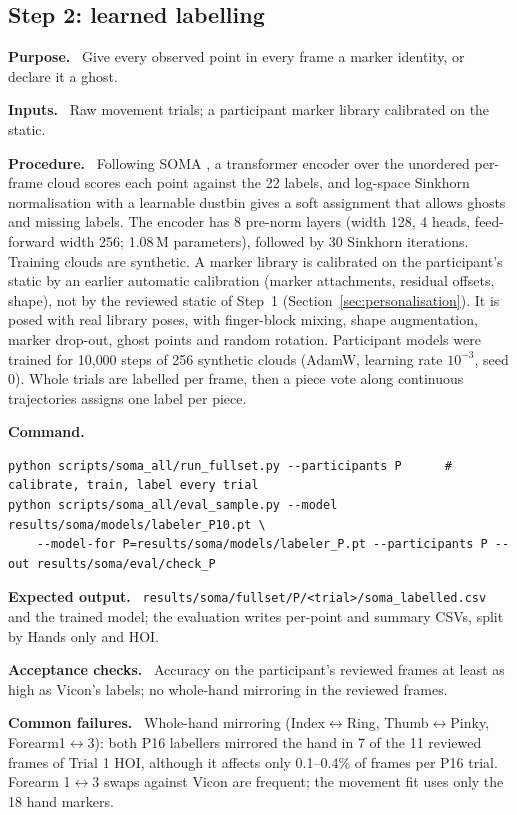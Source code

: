 \documentclass[11pt,a4paper]{article}
\newcommand{\field}[1]{\par\smallskip\noindent\textbf{#1.}\ }
\begin{document}
\subsection{Step 2: learned labelling}\label{sec:step-label}
\field{Purpose} Give every observed point in every frame a marker identity, or declare it a ghost.
\field{Inputs} Raw movement trials; a participant marker library calibrated on the static.
\field{Procedure} Following SOMA \citep{ghorbani2021soma}, a transformer encoder over the unordered per-frame cloud
scores each point against the 22 labels, and log-space Sinkhorn normalisation with a learnable dustbin
\citep{sarlin2020superglue} gives a soft assignment that allows ghosts and missing labels. The encoder has 8 pre-norm
layers (width 128, 4 heads, feed-forward width 256; 1.08\,M parameters), followed by 30 Sinkhorn iterations.
Training clouds are synthetic. A marker library is calibrated on the participant's static by an earlier automatic
calibration (marker attachments, residual offsets, shape), not by the reviewed static of Step~1
(Section~\ref{sec:personalisation}). It is posed with real library poses, with finger-block mixing, shape augmentation,
marker drop-out, ghost points and random rotation. Participant models were trained for 10{,}000 steps of 256
synthetic clouds (AdamW, learning rate $10^{-3}$, seed 0). Whole trials are labelled per frame, then a piece vote along
continuous trajectories assigns one label per piece.
\field{Command}
\begin{lstlisting}
python scripts/soma_all/run_fullset.py --participants P      # calibrate, train, label every trial
python scripts/soma_all/eval_sample.py --model results/soma/models/labeler_P10.pt \
    --model-for P=results/soma/models/labeler_P.pt --participants P --out results/soma/eval/check_P
\end{lstlisting}
\field{Expected output} \texttt{results/soma/fullset/P/<trial>/soma\_labelled.csv} and the trained model; the
evaluation writes per-point and summary CSVs, split by Hands only and HOI.
\field{Acceptance checks} Accuracy on the participant's reviewed frames at least as high as Vicon's labels; no
whole-hand mirroring in the reviewed frames.
\field{Common failures} Whole-hand mirroring (Index$\leftrightarrow$Ring, Thumb$\leftrightarrow$Pinky,
Forearm1$\leftrightarrow$3): both P16 labellers mirrored the hand in 7 of the 11 reviewed frames of Trial 1 HOI,
although it affects only 0.1--0.4\% of frames per P16 trial. Forearm 1$\leftrightarrow$3 swaps against Vicon are
frequent; the movement fit uses only the 18 hand markers.
\end{document}
